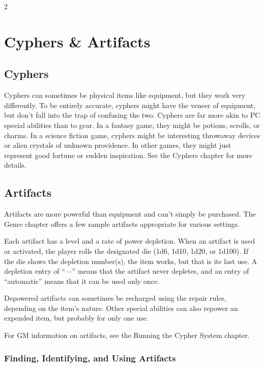 \begin{multicols}{2}

\chapter{Cyphers \& Artifacts}

\section{Cyphers}

Cyphers can sometimes be physical items like equipment, but they work very differently. To be entirely accurate, cyphers might have the veneer of equipment, but don’t fall into the trap of confusing the two. Cyphers are far more akin to PC special abilities than to gear. In a fantasy game, they might be potions, scrolls, or charms. In a science fiction game, cyphers might be interesting throwaway devices or alien crystals of unknown providence. In other games, they might just represent good fortune or sudden inspiration. See the Cyphers chapter for more details.

\section{Artifacts}

Artifacts are more powerful than equipment and can’t simply be purchased. The Genre chapter offers a few sample artifacts appropriate for various settings.

Each artifact has a level and a rate of power depletion. When an artifact is used or activated, the player rolls the designated die (1d6, 1d10, 1d20, or 1d100). If the die shows the depletion number(s), the item works, but that is its last use. A depletion entry of “—” means that the artifact never depletes, and an entry of “automatic” means that it can be used only once.

Depowered artifacts can sometimes be recharged using the repair rules, depending on the item’s nature. Other special abilities can also repower an expended item, but probably for only one use.

For GM information on artifacts, see the Running the Cypher System chapter.

\subsection{Finding, Identifying, and Using Artifacts}


\end{multicols}
